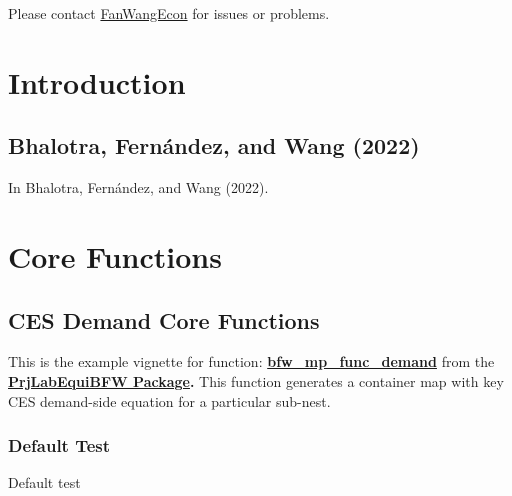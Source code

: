 \documentclass[
]{book}
\begin{document}
Please contact \href{https://fanwangecon.github.io/}{FanWangEcon} for issues or problems.

\hypertarget{introduction}{%
\chapter{Introduction}\label{introduction}}

\hypertarget{bhalotra-fernuxe1ndez-and-wang-2022}{%
\section{Bhalotra, Fernández, and Wang (2022)}\label{bhalotra-fernuxe1ndez-and-wang-2022}}

In Bhalotra, Fernández, and Wang (2022).

\hypertarget{core-functions}{%
\chapter{Core Functions}\label{core-functions}}

\hypertarget{ces-demand-core-functions}{%
\section{CES Demand Core Functions}\label{ces-demand-core-functions}}

This is the example vignette for function:
\href{https://github.com/FanWangEcon/PrjLabEquiBFW/tree/main/PrjLabEquiBFW/func/bfw_mp_func_demand.m}{\textbf{bfw\_mp\_func\_demand}}
from the \href{https://fanwangecon.github.io/PrjLabEquiBFW/}{\textbf{PrjLabEquiBFW
Package}}\textbf{.} This
function generates a container map with key CES demand-side equation for
a particular sub-nest.

\hypertarget{default-test}{%
\subsection{Default Test}\label{default-test}}

Default test
\end{document}
